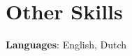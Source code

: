 \documentclass[letterpaper,11pt]{article}
\begin{document}
	\section{Other Skills}
	\begin{itemize}[leftmargin=0.15in, label={}]
		\small{\item{
				\textbf{Languages}{: English, Dutch} \\
		}}
	\end{itemize}
\end{document}
